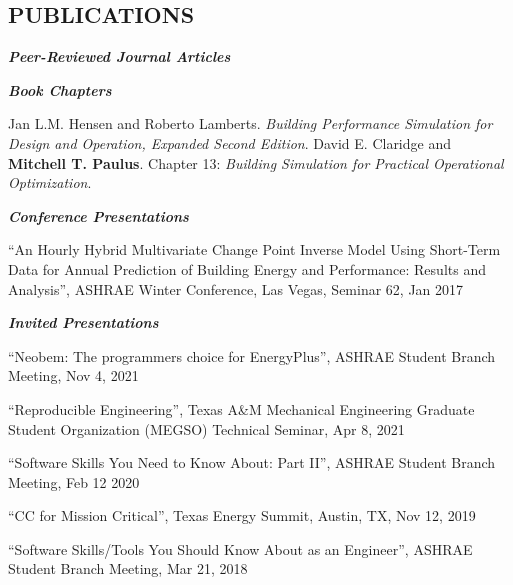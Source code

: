 \documentclass[margin]{res} %
\begin{document}
\begin{resume}
\section{PUBLICATIONS}
{\sl \textbf{Peer-Reviewed Journal Articles}}









{\sl \textbf{Book Chapters}}

Jan L.M. Hensen and Roberto Lamberts. \textit{Building Performance Simulation
for Design and Operation, Expanded Second Edition}. David E. Claridge
and \textbf{Mitchell T. Paulus}. Chapter 13: \textit{Building Simulation
for Practical Operational Optimization}.


\textbf{\textit{Conference Presentations}}

``An Hourly Hybrid Multivariate Change Point Inverse  Model Using Short-Term Data for Annual Prediction of Building Energy and Performance: Results and Analysis'', ASHRAE Winter Conference, Las Vegas, Seminar 62, Jan 2017

\textbf{\textit{Invited Presentations}}

``Neobem: The programmers choice for EnergyPlus'', ASHRAE Student Branch Meeting, Nov 4, 2021

``Reproducible Engineering'', Texas A\&M Mechanical Engineering Graduate
Student Organization (MEGSO) Technical Seminar, Apr 8, 2021

``Software Skills You Need to Know About: Part II'', ASHRAE Student Branch Meeting, Feb 12 2020

``CC\textsuperscript{\textregistered{}} for Mission Critical'', Texas Energy Summit, Austin, TX, Nov 12, 2019

``Software Skills/Tools You Should Know About as an Engineer'', ASHRAE Student Branch Meeting, Mar 21, 2018


\end{resume}
\end{document}
